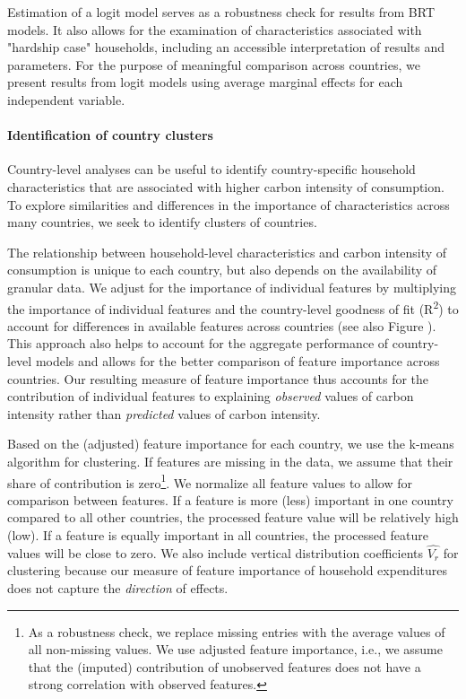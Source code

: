 \documentclass[12pt, a4paper]{article}
\begin{document}
Estimation of a logit model serves as a robustness check for results from BRT models. It also allows for the examination of characteristics associated with "hardship case" households, including an accessible interpretation of results and parameters. For the purpose of meaningful comparison across countries, we present results from logit models using average marginal effects for each independent variable.

\paragraph{Identification of country clusters} Country-level analyses can be useful to identify country-specific household characteristics that are associated with higher carbon intensity of consumption. To explore similarities and differences in the importance of characteristics across many countries, we seek to identify clusters of countries. 

The relationship between household-level characteristics and carbon intensity of consumption is unique to each country, but also depends on the availability of granular data. We adjust for the importance of individual features by multiplying the importance of individual features and the country-level goodness of fit (R\textsuperscript{2}) to account for differences in available features across countries (see also Figure ). This approach also helps to account for the aggregate performance of country-level models and allows for the better comparison of feature importance across countries. Our resulting measure of feature importance thus accounts for the contribution of individual features to explaining \textit{observed} values of carbon intensity rather than \textit{predicted} values of carbon intensity.

Based on the (adjusted) feature importance for each country, we use the k-means algorithm for clustering. If features are missing in the data, we assume that their share of contribution is zero\footnote{As a robustness check, we replace missing entries with the average values of all non-missing values. We use adjusted feature importance, i.e., we assume that the (imputed) contribution of unobserved features does not have a strong correlation with observed features.}. We normalize all feature values to allow for comparison between features. If a feature is more (less) important in one country compared to all other countries, the processed feature value will be relatively high (low). If a feature is equally important in all countries, the processed feature values will be close to zero. We also include vertical distribution coefficients $\widehat{V_{r}}$ for clustering because our measure of feature importance of household expenditures does not capture the \textit{direction} of effects.
\end{document}
